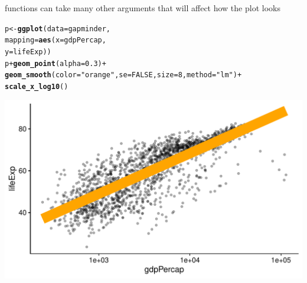 \documentclass[10pt]{beamer}\usepackage[]{graphicx}\usepackage[]{color}
\makeatletter
\def\maxwidth{ %
  \ifdim\Gin@nat@width>\linewidth
    \linewidth
  \else
    \Gin@nat@width
  \fi
}
\newcommand{\hlnum}[1]{\textcolor[rgb]{0.686,0.059,0.569}{#1}}%
\newcommand{\hlstr}[1]{\textcolor[rgb]{0.192,0.494,0.8}{#1}}%
\newcommand{\hlopt}[1]{\textcolor[rgb]{0,0,0}{#1}}%
\newcommand{\hlstd}[1]{\textcolor[rgb]{0.345,0.345,0.345}{#1}}%
\newcommand{\hlkwb}[1]{\textcolor[rgb]{0.69,0.353,0.396}{#1}}%
\newcommand{\hlkwc}[1]{\textcolor[rgb]{0.333,0.667,0.333}{#1}}%
\newcommand{\hlkwd}[1]{\textcolor[rgb]{0.737,0.353,0.396}{\textbf{#1}}}%
\newenvironment{kframe}{%
 \def\at@end@of@kframe{}%
 \ifinner\ifhmode%
  \def\at@end@of@kframe{\end{minipage}}%
  \begin{minipage}{\columnwidth}%
 \fi\fi%
 \def\FrameCommand##1{\hskip\@totalleftmargin \hskip-\fboxsep
 \colorbox{shadecolor}{##1}\hskip-\fboxsep
     \hskip-\linewidth \hskip-\@totalleftmargin \hskip\columnwidth}%
 \MakeFramed {\advance\hsize-\width
   \@totalleftmargin\z@ \linewidth\hsize
   \@setminipage}}%
 {\par\unskip\endMakeFramed%
 \at@end@of@kframe}
\newenvironment{knitrout}{}{} %
\makeatother
\begin{document}
\begin{frame}[fragile]{ functions can take many other arguments that will affect how the plot looks}
\begin{knitrout}\tiny
{}\color{fgcolor}\begin{kframe}
\begin{alltt}
\hlstd{p} \hlkwb{<-} \hlkwd{ggplot}\hlstd{(}\hlkwc{data} \hlstd{= gapminder,}
                \hlkwc{mapping} \hlstd{=} \hlkwd{aes}\hlstd{(}\hlkwc{x} \hlstd{= gdpPercap,}
                                        \hlkwc{y} \hlstd{= lifeExp))}
\hlstd{p} \hlopt{+} \hlkwd{geom_point}\hlstd{(}\hlkwc{alpha} \hlstd{=} \hlnum{0.3}\hlstd{)} \hlopt{+}
\hlkwd{geom_smooth}\hlstd{(}\hlkwc{color} \hlstd{=} \hlstr{"orange"}\hlstd{,} \hlkwc{se} \hlstd{=} \hlnum{FALSE}\hlstd{,} \hlkwc{size} \hlstd{=} \hlnum{8}\hlstd{,} \hlkwc{method} \hlstd{=} \hlstr{"lm"}\hlstd{)} \hlopt{+}
\hlkwd{scale_x_log10}\hlstd{()}
\end{alltt}
\end{kframe}

{\centering \includegraphics[width=\maxwidth]{figure/unnamed-chunk-14-1} 

}


\end{knitrout}
\end{frame}
\end{document}
